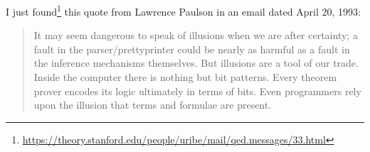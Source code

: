\begin{node}\label{amn-0008}%
I just found\footnote{\url{https://theory.stanford.edu/people/uribe/mail/qed.messages/33.html}} this quote from Lawrence Paulson
in an email dated April 20, 1993:
\begin{quote}
It may seem dangerous to speak of illusions when we are after certainty; a
fault in the parser/prettyprinter could be nearly as harmful as a fault in the
inference mechanisms themselves.  But illusions are a tool of our trade. 
Inside the computer there is nothing but bit patterns.  Every theorem prover
encodes its logic ultimately in terms of bits.  Even programmers rely upon the
illusion that terms and formulae are present.
\end{quote}
\end{node}
